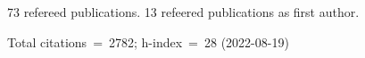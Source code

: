 73 refereed publications. 13 refeered publications as first author.

Total citations~=~2782; h-index~=~28 (2022-08-19)